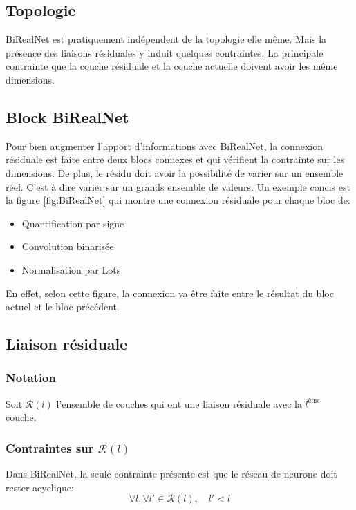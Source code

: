 \subsection{Topologie}
BiRealNet\cite{BiRealNetPaper} est pratiquement indépendent de la topologie elle même. Mais la présence des liaisons résiduales y induit quelques contraintes.
\newline La principale contrainte que la couche résiduale et la couche actuelle doivent avoir les même dimensions.

\subsection{Block BiRealNet}
Pour bien augmenter l'apport d'informations avec BiRealNet, la connexion résiduale est faite entre deux blocs connexes et qui vérifient la contrainte sur les dimensions.
\newline De plus, le résidu doit avoir la possibilité de varier sur un ensemble réel. C'est à dire varier sur un grands ensemble de valeurs.
\newline Un exemple concis est la figure \ref{fig:BiRealNet} qui montre une connexion résiduale pour chaque bloc de:
\begin{itemize}
	\item Quantification par signe
	\item Convolution binarisée
	\item Normalisation par Lots
\end{itemize}
En effet, selon cette figure, la connexion va être faite entre le résultat du bloc actuel et le bloc précédent.
\subsection{Liaison résiduale}
\subsubsection{Notation}
Soit $\mathcal{R}(l)$ l'ensemble de couches qui ont une liaison résiduale avec la $l^\text{ème}$ couche.
\subsubsection{Contraintes sur $\mathcal{R}(l)$}
Dans BiRealNet, la seule contrainte présente est que le réseau de neurone doit rester acyclique:
\begin{equation}
	\forall l,\forall l' \in \mathcal{R}(l), \quad l' < l
\end{equation}
